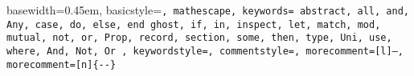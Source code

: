 { basewidth=0.45em,
  basicstyle=\scriptsize\tt,  %
  mathescape,
  keywords={
    abstract, all, and, Any,
    case,
    do,
    else, end
    ghost,
    if, in, inspect,
    let,
    match, mod, mutual,
    not,
    or,
    Prop,
    record,
    section, some,
    then, type,
    Uni, use,
    where,
    And,
    Not,
    Or
  },
  keywordstyle=\color{blue},
  commentstyle=\color{brown},
  morecomment=[l]{--},
  morecomment=[n]{\{-}{-\}}
}

 {\lstset{language=alba}} {}
